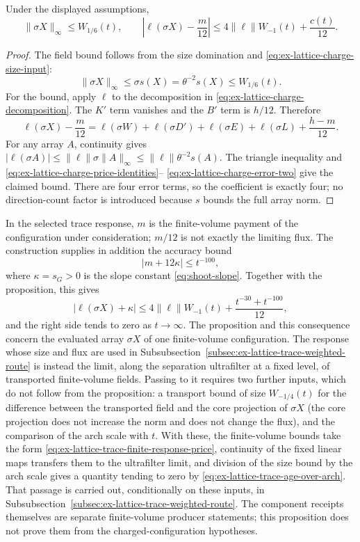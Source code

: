 \begin{proposition}
\label{prop:ex-lattice-charge-bounds}
Under the displayed assumptions,
\[
 \|\sigma X\|_\infty\le W_{1/6}(t),
 \qquad
 \left|\ell(\sigma X)-\frac m{12}\right|
 \le4\|\ell\|W_{-1}(t)+\frac{c(t)}{12}.
\]
\end{proposition}
\begin{proof}
The field bound follows from the size domination and
\eqref{eq:ex-lattice-charge-size-input}:
\[
 \|\sigma X\|_\infty\le\sigma s(X)=\theta^{-2}s(X)\le W_{1/6}(t).
\]
For the bound, apply $\ell$ to the decomposition in
\eqref{eq:ex-lattice-charge-decomposition}. The $K'$ term vanishes and the
$B'$ term is $h/12$. Therefore
\[
 \ell(\sigma X)-\frac m{12}
 =\ell(\sigma W)+\ell(\sigma D')
   +\ell(\sigma E)+\ell(\sigma L)+\frac{h-m}{12}.
\]
For any array $A$, continuity gives
$|\ell(\sigma A)|\le\|\ell\|\sigma\|A\|_\infty\le\|\ell\|\theta^{-2}s(A)$. The triangle
inequality and
\eqref{eq:ex-lattice-charge-price-identities}--
\eqref{eq:ex-lattice-charge-error-two} give the claimed bound. There are
four error terms, so the coefficient is exactly four; no direction-count
factor is introduced because $s$ bounds the full array norm.
\end{proof}

In the selected trace response, $m$ is the finite-volume payment of the
configuration under consideration; $m/12$ is not exactly the limiting flux.
The construction supplies in addition the accuracy bound
\[
 |m+12\kappa|\le t^{-100},
\]
where $\kappa=s_G>0$ is the slope constant \eqref{eq:shoot-slope}. Together with the proposition,
this gives
\[
 |\ell(\sigma X)+\kappa|
   \le4\|\ell\|W_{-1}(t)+\frac{t^{-30}+t^{-100}}{12},
\]
and the right side tends to zero as $t\to\infty$. The proposition and
this consequence concern the evaluated array $\sigma X$ of one
finite-volume configuration. The response whose size and flux are used in
Subsubsection~\ref{subsec:ex-lattice-trace-weighted-route} is instead the limit,
along the separation ultrafilter at a fixed level, of transported
finite-volume fields. Passing to it requires two further inputs, which do
not follow from the proposition: a transport bound of size $W_{-1/4}(t)$
for the difference between the transported field and the core projection
of $\sigma X$ (the core projection does not increase the norm and does not
change the flux), and the comparison of the arch scale with $t$. With
these, the finite-volume bounds take the form
\eqref{eq:ex-lattice-trace-finite-response-price}, continuity of the fixed
linear maps transfers them to the ultrafilter limit, and division of the
size bound by the arch scale gives a quantity tending to zero by
\eqref{eq:ex-lattice-trace-age-over-arch}. That passage is carried out,
conditionally on these inputs, in
Subsubsection~\ref{subsec:ex-lattice-trace-weighted-route}. The component
receipts themselves are separate finite-volume producer statements; this
proposition does not prove them from the charged-configuration hypotheses.

